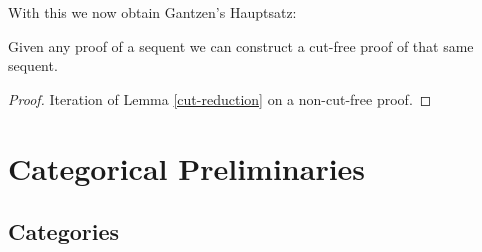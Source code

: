 \documentclass[DIN, pagenumber=false, fontsize=11pt, parskip=half, colorinlistoftodos, svgnames]{scrartcl}
\begin{document}
	With this we now obtain Gantzen's Hauptsatz:
	
	\begin{theorem}
		\label{cut-elimination-theorem}
		Given any proof of a sequent we can construct a cut-free proof of that same sequent.
	\end{theorem}
	
	\begin{proof}
		Iteration of Lemma \ref{cut-reduction} on a non-cut-free proof.
	\end{proof}
	
	
	
	\section{Categorical Preliminaries}
	
	\subsection{Categories}
	\label{sec: catSec}
	
	
\end{document}

